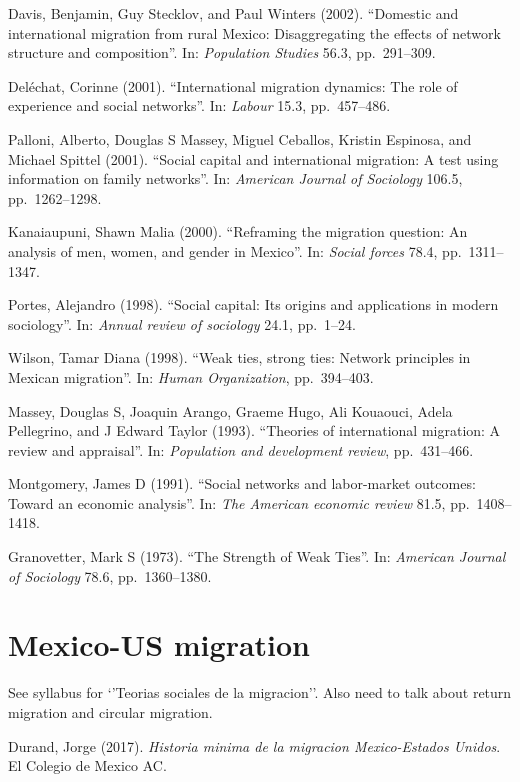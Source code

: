 \documentclass[
  12pt,
]{article}
\begin{document}
Davis, Benjamin, Guy Stecklov, and Paul Winters (2002). ``Domestic and
international migration from rural Mexico: Disaggregating the effects of
network structure and composition''. In: \emph{Population Studies} 56.3,
pp.~291--309.

Deléchat, Corinne (2001). ``International migration dynamics: The role
of experience and social networks''. In: \emph{Labour} 15.3,
pp.~457--486.

Palloni, Alberto, Douglas S Massey, Miguel Ceballos, Kristin Espinosa,
and Michael Spittel (2001). ``Social capital and international
migration: A test using information on family networks''. In:
\emph{American Journal of Sociology} 106.5, pp.~1262--1298.

Kanaiaupuni, Shawn Malia (2000). ``Reframing the migration question: An
analysis of men, women, and gender in Mexico''. In: \emph{Social forces}
78.4, pp.~1311--1347.

Portes, Alejandro (1998). ``Social capital: Its origins and applications
in modern sociology''. In: \emph{Annual review of sociology} 24.1,
pp.~1--24.

Wilson, Tamar Diana (1998). ``Weak ties, strong ties: Network principles
in Mexican migration''. In: \emph{Human Organization}, pp.~394--403.

Massey, Douglas S, Joaquin Arango, Graeme Hugo, Ali Kouaouci, Adela
Pellegrino, and J Edward Taylor (1993). ``Theories of international
migration: A review and appraisal''. In:
\emph{Population and development review}, pp.~431--466.

Montgomery, James D (1991). ``Social networks and labor-market outcomes:
Toward an economic analysis''. In: \emph{The American economic review}
81.5, pp.~1408--1418.

Granovetter, Mark S (1973). ``The Strength of Weak Ties''. In:
\emph{American Journal of Sociology} 78.6, pp.~1360--1380.

\hypertarget{mexico-us-migration}{%
\section{\texorpdfstring{\textbf{Mexico-US
migration}}{Mexico-US migration}}\label{mexico-us-migration}}

See syllabus for `'Teorias sociales de la migracion''. Also need to talk
about return migration and circular migration.

Durand, Jorge (2017).
\emph{Historia minima de la migracion Mexico-Estados Unidos}. El Colegio
de Mexico AC.
\end{document}

